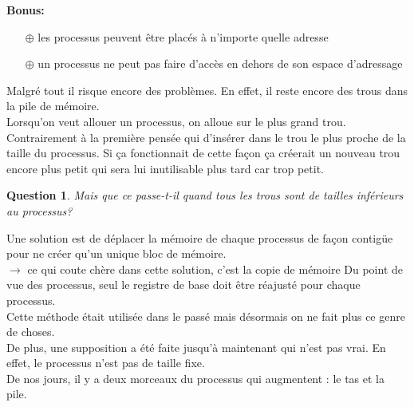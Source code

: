 \documentclass[12pt,a4paper]{report}
\newtheorem*{q}{Question}
\begin{document}
\bigskip

\textbf{Bonus:}
\begin{itemize}
\item[$\oplus$] les processus peuvent être placés à n'importe quelle adresse
\item[$\oplus$] un processus ne peut pas faire d'accès en dehors de son espace d'adressage
\end{itemize}

Malgré tout il risque encore des problèmes. En effet, il reste encore des trous dans la pile de mémoire.\\

Lorsqu'on veut allouer un processus, on alloue sur le plus grand trou. Contrairement à la première pensée qui d'insérer dans le trou le plus proche de la taille du processus. Si ça fonctionnait de cette façon ça créerait un nouveau trou encore plus petit qui sera lui inutilisable plus tard car trop petit.\\

\begin{q}Mais que ce passe-t-il quand tous les trous sont de tailles inférieurs au processus?\end{q}
Une solution est de déplacer la mémoire de chaque processus de façon contigüe pour ne créer qu'un unique bloc de mémoire.\\
$\rightarrow$ ce qui coute chère dans cette solution, c'est la copie de mémoire  Du point de vue des processus, seul le registre de base doit être réajusté pour chaque processus.\\
Cette méthode était utilisée dans le passé mais désormais on
ne fait plus ce genre de choses.\\

De plus, une supposition a été faite jusqu'à maintenant qui n'est pas vrai. En effet, le processus n'est pas de taille fixe.\\
De nos jours, il y a deux morceaux du processus qui augmentent : le tas et la pile. \\

\begin{center}
\end{center}
\end{document}
